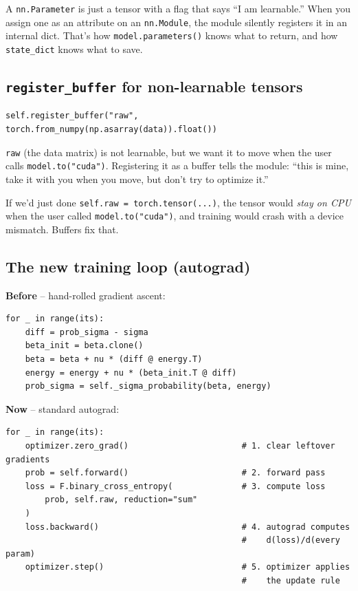 \documentclass[11pt]{article}
\begin{document}
A \texttt{nn.Parameter} is just a tensor with a flag that says ``I am
learnable.'' When you assign one as an attribute on an \texttt{nn.Module}, the
module silently registers it in an internal dict. That's how
\texttt{model.parameters()} knows what to return, and how \texttt{state\_dict}
knows what to save.

\subsection{\texttt{register\_buffer} for non-learnable tensors}

\begin{lstlisting}
self.register_buffer("raw", torch.from_numpy(np.asarray(data)).float())
\end{lstlisting}

\texttt{raw} (the data matrix) is not learnable, but we want it to move when
the user calls \texttt{model.to("cuda")}. Registering it as a buffer tells the
module: ``this is mine, take it with you when you move, but don't try to
optimize it.''

If we'd just done \texttt{self.raw = torch.tensor(...)}, the tensor would
\emph{stay on CPU} when the user called \texttt{model.to("cuda")}, and
training would crash with a device mismatch. Buffers fix that.

\subsection{The new training loop (autograd)}

\textbf{Before} -- hand-rolled gradient ascent:
\begin{lstlisting}
for _ in range(its):
    diff = prob_sigma - sigma
    beta_init = beta.clone()
    beta = beta + nu * (diff @ energy.T)
    energy = energy + nu * (beta_init.T @ diff)
    prob_sigma = self._sigma_probability(beta, energy)
\end{lstlisting}

\textbf{Now} -- standard autograd:
\begin{lstlisting}
for _ in range(its):
    optimizer.zero_grad()                       # 1. clear leftover gradients
    prob = self.forward()                       # 2. forward pass
    loss = F.binary_cross_entropy(              # 3. compute loss
        prob, self.raw, reduction="sum"
    )
    loss.backward()                             # 4. autograd computes
                                                #    d(loss)/d(every param)
    optimizer.step()                            # 5. optimizer applies
                                                #    the update rule
\end{lstlisting}
\end{document}
